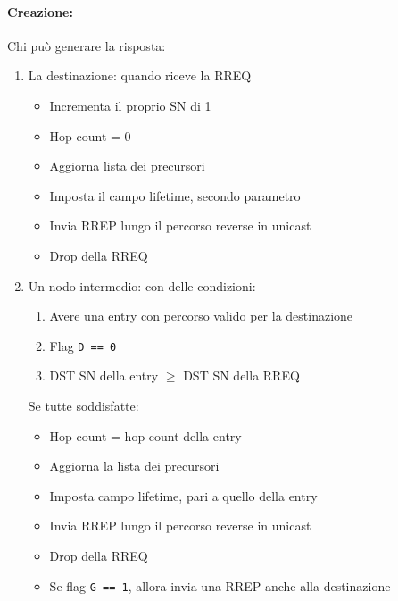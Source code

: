 \paragraph{Creazione:} Chi può generare la risposta: 
\begin{enumerate}
    \item La destinazione: quando riceve la RREQ
    \begin{itemize}
        \item Incrementa il proprio SN di 1
        
        \item Hop count = 0
        
        \item Aggiorna lista dei precursori 
        
        \item Imposta il campo lifetime, secondo parametro
        
        \item Invia RREP lungo il percorso reverse in unicast 
        
        \item Drop della RREQ
    \end{itemize}
    
    \item Un nodo intermedio: con delle condizioni:
    \begin{enumerate}
        \item Avere una entry con percorso valido per la destinazione
        
        \item Flag \texttt{D == 0}
        
        \item DST SN della entry $\geq$ DST SN della RREQ
    \end{enumerate}
    Se tutte soddisfatte:
    \begin{itemize}
        \item Hop count = hop count della entry
        
        \item Aggiorna la lista dei precursori
        
        \item Imposta campo lifetime, pari a quello della entry
        
        \item Invia RREP lungo il percorso reverse in unicast
        
        \item Drop della RREQ
        
        \item Se flag \texttt{G == 1}, allora invia una RREP anche alla destinazione
    \end{itemize}
\end{enumerate}

